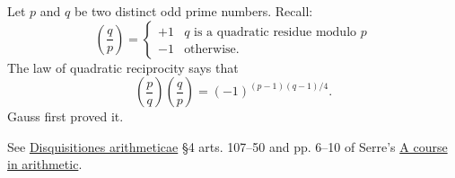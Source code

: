 \documentclass [preview, border = 20pt] {standalone}
\begin{document}
\pagecolor{black}
\color{white}
Let $p$ and $q$ be two distinct odd prime numbers. Recall:
\[
\left( \frac q p\right) = \begin{cases}
  +1 & \textrm{$q$ is a quadratic residue modulo $p$}\\
  -1 & \textrm{otherwise.}
\end{cases}
\]
The law of quadratic reciprocity says that
\[
\left( \frac p q\right)\left( \frac q p\right) = (-1)^{(p-1)(q-1)/4}.
\]
Gauss first proved it. 

\footnotesize
See \ul{Disquisitiones arithmeticae} \S 4 arts. 107--50 and pp. 6--10 of Serre's \ul{A course in arithmetic}.
\end{document}
